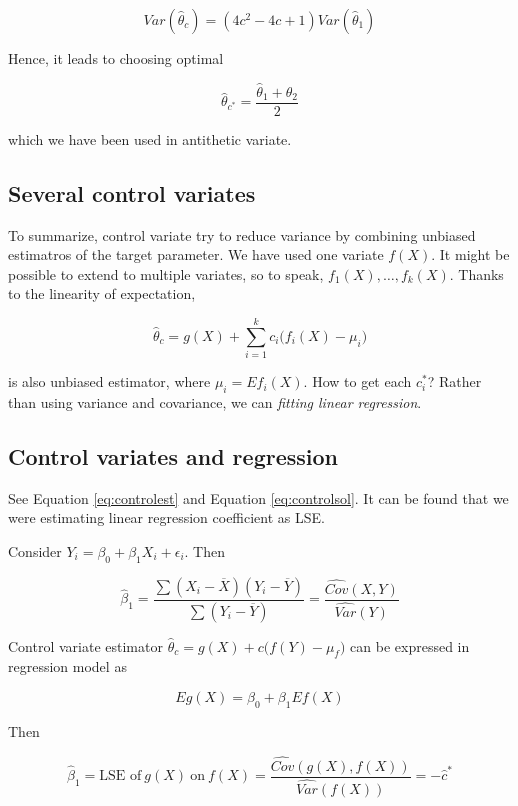 \documentclass[]{book}
\theoremstyle{definition}
\theoremstyle{definition}
\theoremstyle{definition}
\theoremstyle{remark}
\let\BeginKnitrBlock\begin \let\EndKnitrBlock\end
\begin{document}
\[Var(\hat\theta_c) = (4c^2 - 4c + 1)Var(\hat\theta_1)\]

Hence, it leads to choosing optimal

\[\hat\theta_{c^{\ast}} = \frac{\hat\theta_1 + \hat\theta_2}{2}\]

which we have been used in antithetic variate.

\hypertarget{several-control-variates}{%
\subsection{Several control variates}\label{several-control-variates}}

To summarize, control variate try to reduce variance by combining unbiased estimatros of the target parameter. We have used one variate \(f(X)\). It might be possible to extend to multiple variates, so to speak, \(f_1(X), \ldots, f_k(X)\). Thanks to the linearity of expectation,

\[\hat\theta_c = g(X) + \sum_{i = 1}^k c_i \Big(f_i (X) - \mu_i\Big)\]

is also unbiased estimator, where \(\mu_i = E f_i(X)\). How to get each \(c_i^{\ast}\)? Rather than using variance and covariance, we can \emph{fitting linear regression}.

\hypertarget{control-variates-and-regression}{%
\subsection{Control variates and regression}\label{control-variates-and-regression}}

See Equation \eqref{eq:controlest} and Equation \eqref{eq:controlsol}. It can be found that we were estimating linear regression coefficient as LSE.

\BeginKnitrBlock{lemma}[Least squares estimator]
\protect\hypertarget{lem:lse}{}{\label{lem:lse} {} }Consider \(Y_i = \beta_0 + \beta_1 X_i + \epsilon_i\). Then

\[\hat\beta_1 = \frac{\sum(X_i - \overline{X})(Y_i - \overline{Y})}{\sum (Y_i - \overline{Y})} = \frac{\widehat{Cov}(X, Y)}{\widehat{Var}(Y)}\]
\EndKnitrBlock{lemma}

Control variate estimator \(\hat\theta_c = g(X) + c\Big(f(Y) - \mu_f\Big)\) can be expressed in regression model as

\[Eg(X) = \beta_0 + \beta_1 E f(X)\]

Then

\begin{equation}
  \hat\beta_1 = \text{LSE of}\: g(X) \:\text{on}\: f(X) = \frac{\widehat{Cov}(g(X), f(X))}{\widehat{Var}(f(X))} = -\hat{c}^{\ast}
  \label{eq:controlbeta}
\end{equation}
\end{document}
